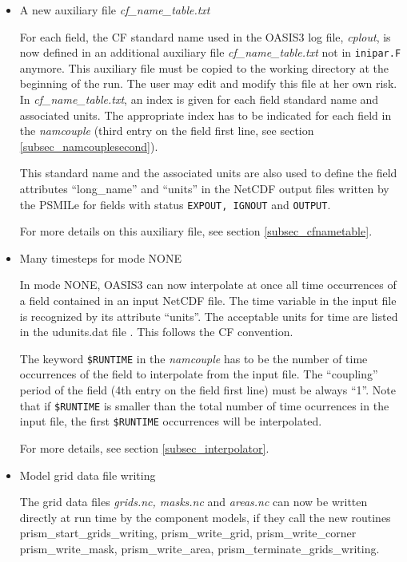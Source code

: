 \begin{itemize}
\item A new auxiliary file {\em cf\_name\_table.txt}

For each field, the CF standard name used in the OASIS3 log file, {\em
cplout}, is now defined in an additional auxiliary file {\em
cf\_name\_table.txt} 
not in {\tt inipar.F} anymore. This auxiliary file must be
copied to the working directory at the beginning of the run. The user
may edit and modify this file at her own risk. In {\em
cf\_name\_table.txt}, an index is given for each field standard name
and associated units.  The appropriate index has to be indicated for
each field in the {\it namcouple} (third entry on the field first
line, see section \ref{subsec_namcouplesecond}). 

This standard name and the associated units are also used to define the
field attributes ``long\_name'' and ``units'' in the NetCDF output files
written by the PSMILe for fields with status {\tt EXPOUT, IGNOUT} and
{\tt OUTPUT}.
 
For more details on this auxiliary file, see section
\ref{subsec_cfnametable}.

\item Many timesteps for mode NONE

In mode NONE, OASIS3 can now interpolate at once all time occurrences
of a field contained in an input NetCDF file. The time variable in the
input file is recognized by its attribute ``units''. The acceptable
units for time are listed in the udunits.dat file \cite{udunits}. This
follows the CF convention.

The keyword {\tt \$RUNTIME} in the {\it namcouple} has to be the number of time
occurrences of the field to interpolate from the input file. The
``coupling'' period of the field (4th entry on the field first line)
must be always ``1''. Note that if {\tt \$RUNTIME} is smaller than the
total number of time ocurrences in the input file, the first {\tt \$RUNTIME} 
occurrences will be interpolated.

For more details, see section \ref{subsec_interpolator}.

\item Model grid data file writing

The grid data files {\em grids.nc, masks.nc} and {\em areas.nc} can
now be written directly at run time by the component models, if they
call the new routines prism\_start\_grids\_writing, prism\_write\_grid,
prism\_write\_corner prism\_write\_mask, prism\_write\_area,
prism\_terminate\_grids\_writing. 


\end{itemize}
